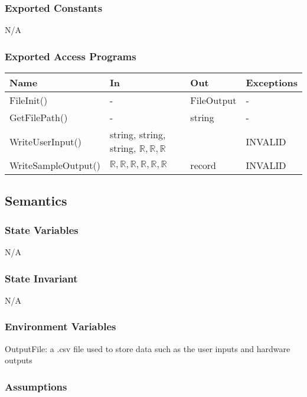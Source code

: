 \documentclass[12pt, titlepage]{article}
\begin{document}
\subsubsection{Exported Constants}

N/A

\subsubsection{Exported Access Programs}

\begin{center}
\begin{tabular}{p{4cm} p{6cm} p{2cm} p{3cm}}
\hline
\textbf{Name} & \textbf{In} & \textbf{Out} & \textbf{Exceptions} \\
\hline
FileInit() & - & FileOutput & - \\
GetFilePath() & - & string &  -\\
WriteUserInput() & string, string, string, $\mathbb{R}, \mathbb{R}, \mathbb{R}$&  & INVALID \\
WriteSampleOutput()& $\mathbb{R}, \mathbb{R}, \mathbb{R}, \mathbb{R}, \mathbb{R}, \mathbb{R}$ & record & INVALID \\

\hline
\end{tabular}
\end{center}

\subsection{Semantics}

\subsubsection{State Variables}

N/A
\subsubsection{State Invariant}

N/A
\subsubsection{Environment Variables}

OutputFile: a .csv file used to store data such as the user inputs and hardware outputs

\subsubsection{Assumptions}
\end{document}
